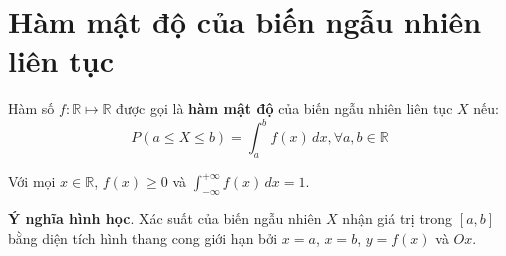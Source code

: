 \section{Hàm mật độ của biến ngẫu nhiên liên tục}

\begin{definition}
    Hàm số $f: \mathbb{R} \mapsto \mathbb{R}$ được gọi là \textbf{hàm mật độ} của biến ngẫu nhiên liên tục $X$ nếu: \[P(a \leq X \leq b) = \displaystyle{\int_a^b f(x)\,dx}, \forall a, b \in \mathbb{R}\]
\end{definition}

\begin{remark}
    Với mọi $x \in \mathbb{R}$, $f(x) \geq 0$ và $\displaystyle{\int_{-\infty}^{+\infty}f(x)\,dx = 1}$.
\end{remark}

\textbf{Ý nghĩa hình học}. Xác suất của biến ngẫu nhiên $X$ nhận giá trị trong $[a, b]$ bằng diện tích hình thang cong giới hạn bởi $x=a$, $x=b$, $y=f(x)$ và $Ox$.
